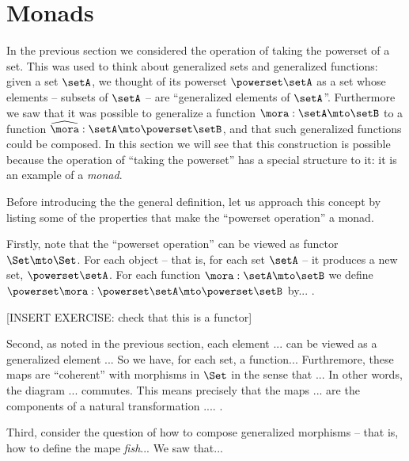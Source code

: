 

\section{Monads}
\label{sec:monads}

In the previous section we considered the operation of taking the powerset of a set. This was used to think about generalized sets and generalized functions: given a set $\setA$, we thought of its powerset $\powerset \setA$ as a set whose elements -- subsets of $\setA$ -- are ``generalized elements of $\setA$''. Furthermore we saw that it was possible to generalize a function $\mora : \setA \mto \setB$ to a function $\widehat \mora:  \setA \mto \powerset \setB$, and that such generalized functions could be composed. In this section we will see that this construction is possible because the operation of ``taking the powerset'' has a special structure to it: it is an example of a \emph{monad}. 

Before introducing the the general definition, let us approach this concept by listing some of the properties that make the ``powerset operation''  a monad. 

Firstly, note that the ``powerset operation'' can be viewed as functor $\Set \mto \Set$. For each object -- that is, for each set $\setA$ -- it produces a new set, $\powerset \setA$. For each function $\mora: \setA \mto \setB$ we define $\powerset \mora : \powerset \setA \mto \powerset \setB$ by... .

[INSERT EXERCISE: check that this is a functor]


Second, as noted in the previous section, each element ... can be viewed as a generalized element ... So we have, for each set, a function... 
Furthremore, these maps are ``coherent'' with morphisms in $\Set$ in the sense that ...  In other words, the diagram ... commutes. This means precisely that the maps ... are the components of a natural transformation .... . 

Third, consider the question of how to compose generalized morphisms -- that is, how to define the mape \emph{fish}... We saw that... 

